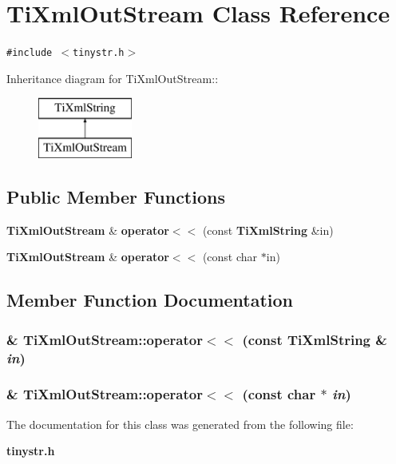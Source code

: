 \section{TiXmlOutStream Class Reference}
\label{classTiXmlOutStream}
{\tt \#include $<$tinystr.h$>$}

Inheritance diagram for TiXmlOutStream::\begin{figure}[H]
\begin{center}
\leavevmode
\includegraphics[height=2cm]{classTiXmlOutStream}
\end{center}
\end{figure}
\subsection*{Public Member Functions}
\begin{CompactItemize}
\item 
{\bf TiXmlOutStream} \& {\bf operator$<$$<$} (const {\bf TiXmlString} \&in)
\item 
{\bf TiXmlOutStream} \& {\bf operator$<$$<$} (const char $\ast$in)
\end{CompactItemize}


\subsection{Member Function Documentation}
\subsubsection[operator$<$$<$]{\& TiXmlOutStream::operator$<$$<$ (const {\bf TiXmlString} \& {\em in})\hspace{0.3cm}{\tt  [inline]}}\label{classTiXmlOutStream_3640dcb1c0903be3bc6966cdc9a79db6}


\subsubsection[operator$<$$<$]{\& TiXmlOutStream::operator$<$$<$ (const char $\ast$ {\em in})\hspace{0.3cm}{\tt  [inline]}}\label{classTiXmlOutStream_f2117e5a8cbfcb69544804ad2859bfb6}




The documentation for this class was generated from the following file:\begin{CompactItemize}
\item 
{\bf tinystr.h}\end{CompactItemize}
